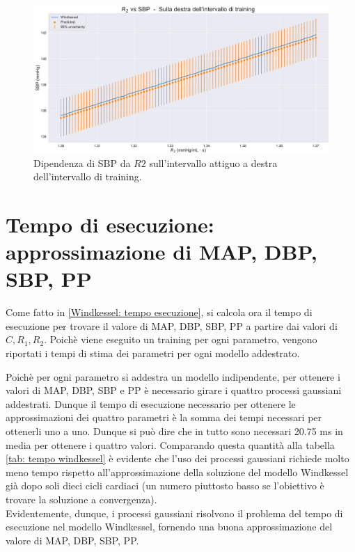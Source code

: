 \begin{figure}
    \centering
    \includegraphics[width=1\textwidth]{images/Training (risultati)/SBP/SBP - R2 - dx.pdf}
    \caption{Dipendenza di SBP da $R2$ sull'intervallo attiguo a destra dell'intervallo di training.}
    \label{SBP - R2 - dx}
\end{figure}

\section{Tempo di esecuzione: approssimazione di MAP, DBP, SBP, PP}
Come fatto in \ref{Windkessel: tempo esecuzione}, si calcola ora il tempo di esecuzione per trovare il valore di MAP, DBP, SBP, PP a partire dai valori di $C, R_1, R_2$. Poichè viene eseguito un training per ogni parametro, vengono riportati i tempi di stima dei parametri per ogni modello addestrato.



Poichè per ogni parametro si addestra un modello indipendente, per ottenere i valori di MAP, DBP, SBP e PP è necessario girare i quattro processi gaussiani addestrati. Dunque il tempo di esecuzione necessario per ottenere le approssimazioni dei quattro parametri è la somma dei tempi necessari per ottenerli uno a uno. Dunque si può dire che in tutto sono necessari 20.75 ms in media per ottenere i quattro valori.
Comparando questa quantità alla tabella \ref{tab: tempo windkessel} è evidente che l'uso dei processi gaussiani richiede molto meno tempo rispetto all'approssimazione della soluzione del modello Windkessel già dopo soli dieci cicli cardiaci (un numero piuttosto basso se l'obiettivo è trovare la soluzione a convergenza). \\


Evidentemente, dunque, i processi gaussiani risolvono il problema del tempo di esecuzione nel modello Windkessel, fornendo una buona approssimazione del valore di MAP, DBP, SBP, PP.
